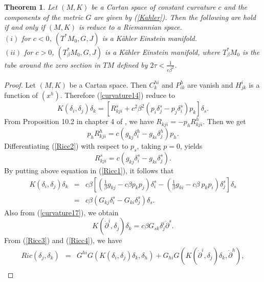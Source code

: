 \documentclass[10pt,a4paper]{article}
\theoremstyle{plain}
\newtheorem{theorem}{Theorem}[section]
\theoremstyle{definition}
\begin{document}
\begin{theorem}\label{THM2}
Let $(M,K)$ be a Cartan space of constant curvature $c$ and the
components of the metric $G$ are given by (\ref{Kahler}).
Then the following are hold if and only if $(M,K)$ is reduce to a Riemannian space.\\
$(i)$ for $c<0$, $(T^{\ast}M_0,G,J)$ is a K\"{a}hler Einstein manifold.\\
$(ii)$ for $c>0$, $(T_{\beta}^{\ast}M_0,G,J)$ is a K\"{a}hler
Einstein manifold, where $T_{\beta}^{\ast}M_0$ is the tube around the
zero section in $TM$ defined by $2\tau<\frac{1}{c\beta^2}$.
\end{theorem}
\begin{proof}
Let $(M,K)$ be a Cartan space. Then $C^{hi}_k$ and $P^h_{ik}$
are vanish and $H^i_{jk}$ is a function of $(x^h)$. Therefore
(\ref{curvature14}) reduce to
\begin{equation}
K(\delta_i,\delta_j)\delta_k=[R^s_{kji}+c^2\beta^2(p_i\delta^s_j-p_j\delta^s_i)p_k]\delta_s.\label{Ricc1}
\end{equation}
From Proposition 10.2 in chapter 4 of \cite{MirHri}, we have
$R_{kji}=-p_hR^h_{kji}$. Then we get
\begin{equation}
p_hR^h_{kji}=c(g_{kj}\delta^h_i-g_{ki}\delta^h_j)p_h.\label{Ricc2}
\end{equation}
Differentiating  (\ref{Ricc2}) with respect to $p_s$, taking
$p=0$, yields
\[
R^s_{kji}=c(g_{kj}\delta^s_i-g_{ki}\delta^s_j).
\]
By putting above equation in (\ref{Ricc1}), it follows that
\begin{eqnarray}
K(\delta_i,\delta_j)\delta_k\!\!\!\!&=&\!\!\!\!c\beta[(\frac{1}{\beta}g_{kj}-c\beta
p_kp_j)\delta^s_i-(\frac{1}{\beta}g_{ki}-c\beta\
p_kp_i)\delta^s_j]\delta_s\nonumber\\
\!\!\!\!&=&\!\!\!\!c\beta(G_{kj}\delta^s_i-G_{ki}\delta^s_j)\delta_s.\label{Ricc3}
\end{eqnarray}
Also from (\ref{curvature17}), we obtain
\begin{equation}
K({\dot{\partial}}^i,\delta_j)\delta_k=c\beta
G_{sk}\delta^i_j{\dot{\partial}}^s.\label{Ricc4}
\end{equation}
From (\ref{Ricc3}) and (\ref{Ricc4}), we have
\begin{eqnarray}
Ric(\delta_j,\delta_k)\!\!\!\!&=&\!\!\!\!G^{hi}G(K(\delta_i,\delta_j)\delta_k,\delta_h)+G_{hi}G(K({\dot{\partial}}^i,\delta_j)\delta_k,{\dot{\partial}}^h),\nonumber\\

\end{eqnarray}
\end{proof}
\end{document}
